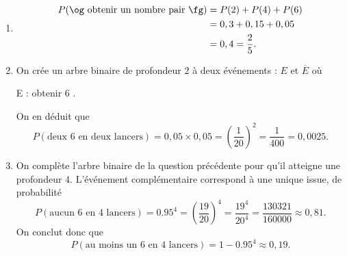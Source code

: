 {	\begin{enumerate}
		\item 
			\begin{align*}
				P(\text{\og obtenir un nombre pair \fg}) &= P(2) + P(4) + P(6) \\
				&= 0,3 + 0,15 + 0,05 \\
				&= 0,4 = \frac25.
			\end{align*}
		\item
			On crée un arbre binaire de profondeur $2$ à deux événements : $E$ et $\overline{E}$ où
				\begin{center}
					E : \og obtenir $6$ \fg.
				\end{center}
			On en déduit que
			\[ P(\text{deux $6$ en deux lancers}) = 0,05 \times 0,05 = \left(\dfrac1{20}\right)^2 = \dfrac1{400} = 0,0025. \]
		\item
			On complète l'arbre binaire de la question précédente pour qu'il atteigne une profondeur $4$.
			L'événement complémentaire correspond à une unique issue, de probabilité
				\[ P(\text{aucun $6$ en $4$ lancers}) = 0.95^4 = \left(\dfrac{19}{20}\right)^4 = \dfrac{19^4}{20^4} = \dfrac{130321}{160000} \approx 0,81. \]
			On conclut donc que
				\[ P(\text{au moins un $6$ en $4$ lancers}) = 1-0.95^4 \approx 0,19. \]
				
	\end{enumerate}
}

